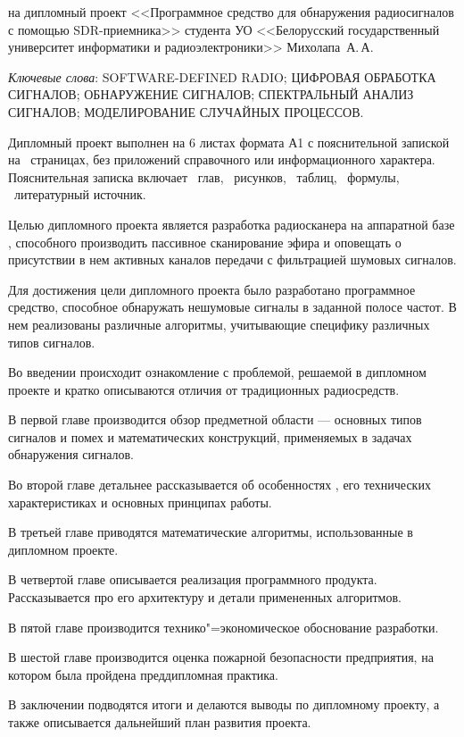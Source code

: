 \thispagestyle{empty}

\begin{center}
  \begin{minipage}{0.82\textwidth}
    на дипломный проект <<Программное средство для обнаружения радиосигналов с помощью SDR-приемника>> студента УО <<Белорусский государственный университет информатики и радиоэлектроники>> Михолапа~А.\,А.
  \end{minipage}
\end{center}

\emph{Ключевые слова}: \MakeUppercase{software-defined radio; цифровая обработка сигналов; обнаружение сигналов; спектральный анализ сигналов; моделирование случайных процессов}.

\vspace{4\parsep}

Дипломный проект выполнен на 6 листах формата А1 с пояснительной запиской на~\pageref*{LastPage} страницах, без приложений справочного или информационного характера. 
Пояснительная записка включает ~глав, \totfig{}~рисунков, \tottab{}~таблиц, \toteq{}~формулы, \totref{}~литературный источник.

Целью дипломного проекта является разработка радиосканера на аппаратной базе \sdr, способного производить пассивное сканирование эфира и оповещать о присутствии в нем активных каналов передачи с фильтрацией шумовых сигналов.

Для достижения цели дипломного проекта было разработано программное средство, способное обнаружать нешумовые сигналы в заданной полосе частот.
В нем реализованы различные алгоритмы, учитывающие специфику различных типов сигналов.

Во введении происходит ознакомление с проблемой, решаемой в дипломном проекте и кратко описываются отличия \sdr от традиционных радиосредств.

В первой главе производится обзор предметной области --- основных типов сигналов и помех и математических конструкций, применяемых в задачах обнаружения сигналов.

Во второй главе детальнее рассказывается об особенностях \SDR, его технических характеристиках и основных принципах работы.

В третьей главе приводятся математические алгоритмы, использованные в дипломном проекте.

В четвертой главе описывается реализация программного продукта.
Рассказывается про его архитектуру и детали примененных алгоритмов.

В пятой главе производится технико"=экономическое обоснование разработки.

В шестой главе производится оценка пожарной безопасности предприятия, на котором была пройдена преддипломная практика.

В заключении подводятся итоги и делаются выводы по дипломному проекту, а также описывается дальнейший план развития проекта.

\clearpage
